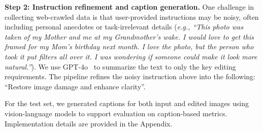 \noindent\textbf{Step 2: Instruction refinement and caption generation.}
One challenge in collecting web-crawled data is that user-provided instructions may be noisy, often including personal anecdotes or task-irrelevant details
(\textit{e.g., ``This photo was taken of my Mother and me at my Grandmother’s wake. I would love to get this framed for my Mom’s birthday next month. I love the photo, but the person who took it put filters all over it. I was wondering if someone could make it look more natural.''}). We use GPT-4o~\cite{openai2023gpt4} to summarize the text to only the key editing requirements. The pipeline refines the noisy instruction above into the following: ``Restore image damage and enhance clarity''.

For the \RealEdit test set, we generated captions for both input and edited images using vision-language models to support evaluation on caption-based metrics. Implementation details are provided in the Appendix.





